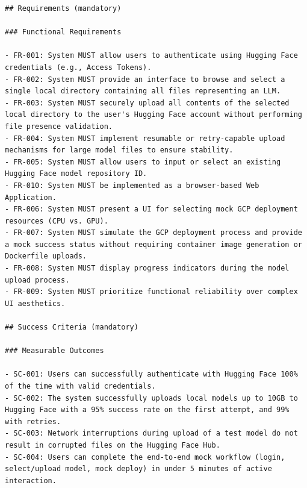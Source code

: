 \documentclass[a4paper,12pt]{report}
\begin{document}
\begin{lstlisting}[caption={Feature Specification (spec.md)}]
## Requirements (mandatory)

### Functional Requirements

- FR-001: System MUST allow users to authenticate using Hugging Face credentials (e.g., Access Tokens).
- FR-002: System MUST provide an interface to browse and select a single local directory containing all files representing an LLM.
- FR-003: System MUST securely upload all contents of the selected local directory to the user's Hugging Face account without performing file presence validation.
- FR-004: System MUST implement resumable or retry-capable upload mechanisms for large model files to ensure stability.
- FR-005: System MUST allow users to input or select an existing Hugging Face model repository ID.
- FR-010: System MUST be implemented as a browser-based Web Application.
- FR-006: System MUST present a UI for selecting mock GCP deployment resources (CPU vs. GPU).
- FR-007: System MUST simulate the GCP deployment process and provide a mock success status without requiring container image generation or Dockerfile uploads.
- FR-008: System MUST display progress indicators during the model upload process.
- FR-009: System MUST prioritize functional reliability over complex UI aesthetics.

## Success Criteria (mandatory)

### Measurable Outcomes

- SC-001: Users can successfully authenticate with Hugging Face 100% of the time with valid credentials.
- SC-002: The system successfully uploads local models up to 10GB to Hugging Face with a 95% success rate on the first attempt, and 99% with retries.
- SC-003: Network interruptions during upload of a test model do not result in corrupted files on the Hugging Face Hub.
- SC-004: Users can complete the end-to-end mock workflow (login, select/upload model, mock deploy) in under 5 minutes of active interaction.
\end{lstlisting}
\end{document}
